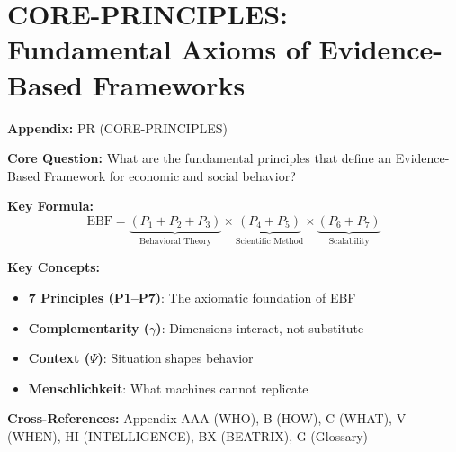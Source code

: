 \chapter{CORE-PRINCIPLES: Fundamental Axioms of Evidence-Based Frameworks}
\label{app:core-principles}


\begin{tcolorbox}[colback=blue!5!white, colframe=blue!75!black,
    title=Quick Reference: Appendix PR]

\textbf{Appendix:} PR (CORE-PRINCIPLES)

\textbf{Core Question:} What are the fundamental principles that define an Evidence-Based Framework for economic and social behavior?

\textbf{Key Formula:}
\begin{equation}
\text{EBF} = \underbrace{(P_1 + P_2 + P_3)}_{\text{Behavioral Theory}} \times \underbrace{(P_4 + P_5)}_{\text{Scientific Method}} \times \underbrace{(P_6 + P_7)}_{\text{Scalability}}
\label{eq:pr-ebf}
\end{equation}

\textbf{Key Concepts:}
\begin{itemize}[nosep]
\item \textbf{7 Principles (P1--P7)}: The axiomatic foundation of EBF
\item \textbf{Complementarity ($\gamma$)}: Dimensions interact, not substitute
\item \textbf{Context ($\Psi$)}: Situation shapes behavior
\item \textbf{Menschlichkeit}: What machines cannot replicate
\end{itemize}

\textbf{Cross-References:} Appendix AAA (WHO), B (HOW), C (WHAT), V (WHEN), HI (INTELLIGENCE), BX (BEATRIX), G (Glossary)
\end{tcolorbox}


\begin{abstract}
This appendix formalizes the \textbf{seven fundamental principles} that constitute an Evidence-Based Framework (EBF) for economic and social behavior. These principles---Complementarity (P1), Context (P2), Systematik (P3), Evidence (P4), Falsifiability (P5), Human-Machine Complementarity (P6), and Cumulation (P7)---define what distinguishes EBF from ad-hoc behavioral analysis. Together, they form a coherent axiomatic system that guides all EBF applications.
\end{abstract}


